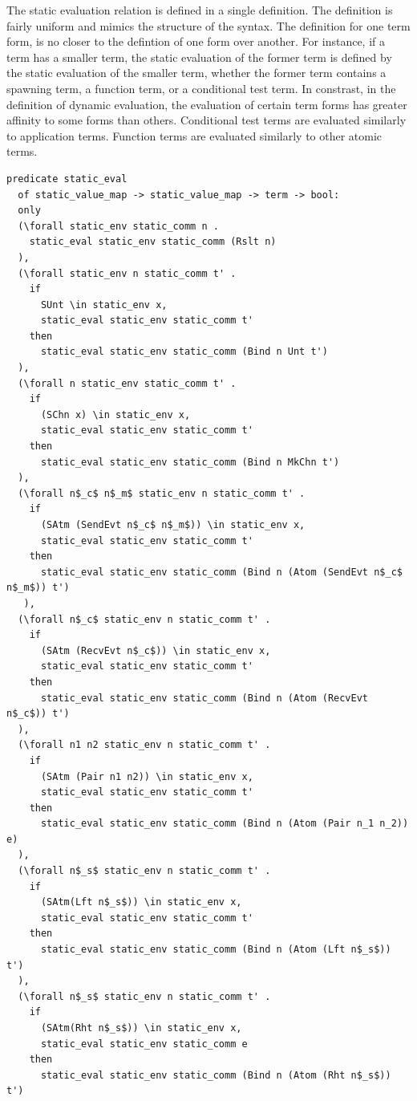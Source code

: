 \documentclass[10pt]{article}
\begin{document}
The static evaluation relation is defined in a single definition.
The definition is fairly uniform and mimics the structure of the syntax.
The definition for one term form, is no closer to the defintion of one form over another.
For instance, if a term has a smaller term,
the static evaluation of the former term is defined
by the static evaluation of the smaller term,
whether the former term contains a spawning term, a function term, or a conditional test term.
In constrast, in the definition of dynamic evaluation,
the evaluation of certain term forms has greater affinity to some forms than others.
Conditional test terms are evaluated similarly to application terms. 
Function terms are evaluated similarly to other atomic terms.


\begin{lstlisting}[language=logic, mathescape]
  predicate static_eval
  of static_value_map -> static_value_map -> term -> bool:
  only
  (\forall static_env static_comm n .
    static_eval static_env static_comm (Rslt n)
  ),
  (\forall static_env n static_comm t' .
    if 
      SUnt \in static_env x,
      static_eval static_env static_comm t'
    then
      static_eval static_env static_comm (Bind n Unt t')
  ),
  (\forall n static_env static_comm t' .
    if 
      (SChn x) \in static_env x,
      static_eval static_env static_comm t'
    then  
      static_eval static_env static_comm (Bind n MkChn t')
  ),
  (\forall n$_c$ n$_m$ static_env n static_comm t' .
    if
      (SAtm (SendEvt n$_c$ n$_m$)) \in static_env x,
      static_eval static_env static_comm t' 
    then
      static_eval static_env static_comm (Bind n (Atom (SendEvt n$_c$ n$_m$)) t')
   ),
  (\forall n$_c$ static_env n static_comm t' . 
    if 
      (SAtm (RecvEvt n$_c$)) \in static_env x,
      static_eval static_env static_comm t'
    then
      static_eval static_env static_comm (Bind n (Atom (RecvEvt n$_c$)) t')
  ),
  (\forall n1 n2 static_env n static_comm t' .
    if
      (SAtm (Pair n1 n2)) \in static_env x,
      static_eval static_env static_comm t'
    then
      static_eval static_env static_comm (Bind n (Atom (Pair n_1 n_2)) e)
  ),
  (\forall n$_s$ static_env n static_comm t' .
    if
      (SAtm(Lft n$_s$)) \in static_env x,
      static_eval static_env static_comm t' 
    then
      static_eval static_env static_comm (Bind n (Atom (Lft n$_s$)) t')
  ),
  (\forall n$_s$ static_env n static_comm t' .
    if
      (SAtm(Rht n$_s$)) \in static_env x, 
      static_eval static_env static_comm e
    then
      static_eval static_env static_comm (Bind n (Atom (Rht n$_s$)) t')

\end{lstlisting}
\end{document}
